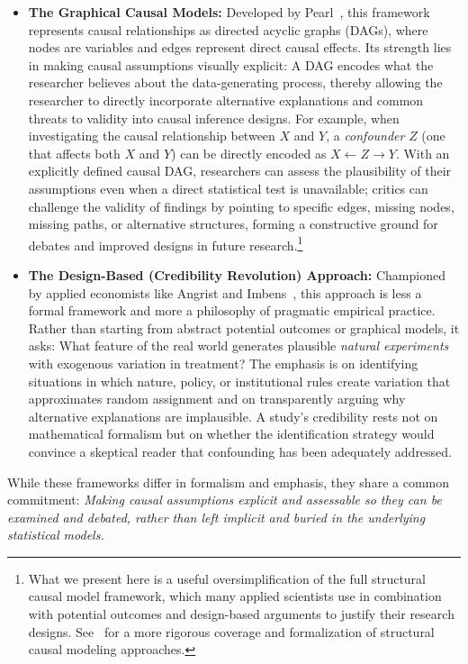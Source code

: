\begin{itemize}[leftmargin=15pt]
    \item \textbf{The Graphical Causal Models:} Developed by Pearl~\cite{pearl2009causality}, this framework represents causal relationships as directed acyclic graphs (DAGs), where nodes are variables and edges represent direct causal effects.
    Its strength lies in making causal assumptions visually explicit: A DAG encodes what the researcher believes about the data-generating process, thereby allowing the researcher to directly incorporate alternative explanations and common threats to validity into causal inference designs.
    For example, when investigating the causal relationship between $X$ and $Y$, a \emph{confounder} $Z$ (one that affects both $X$ and $Y$) can be directly encoded as $X \leftarrow Z \rightarrow Y$.
    With an explicitly defined causal DAG, researchers can assess the plausibility of their assumptions even when a direct statistical test is unavailable; critics can challenge the validity of findings by pointing to specific edges, missing nodes, missing paths, or alternative structures, forming a constructive ground for debates and improved designs in future research.\footnote{What we present here is a useful oversimplification of the full structural causal model framework, which many applied scientists use in combination with potential outcomes and design-based arguments to justify their research designs. See~\citet{pearl2009causality} for a more rigorous coverage and formalization of structural causal modeling approaches.}
    
    \item \textbf{The Design-Based (Credibility Revolution) Approach:} Championed by applied economists like Angrist and Imbens~\cite{angrist1996identification}, this approach is less a formal framework and more a philosophy of pragmatic empirical practice.
    Rather than starting from abstract potential outcomes or graphical models, it asks: What feature of the real world generates plausible \emph{natural experiments} with exogenous variation in treatment?
    The emphasis is on identifying situations in which nature, policy, or institutional rules create variation that approximates random assignment and on transparently arguing why alternative explanations are implausible.
    A study's credibility rests not on mathematical formalism but on whether the identification strategy would convince a skeptical reader that confounding has been adequately addressed.
\end{itemize}
While these frameworks differ in formalism and emphasis, they share a common commitment: \emph{Making causal assumptions explicit and assessable so they can be examined and debated, rather than left implicit and buried in the underlying statistical models.}

